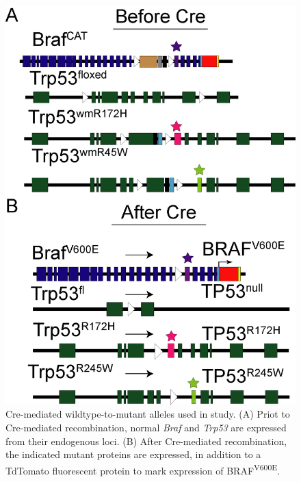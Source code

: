 \begin{figure}
\hypertarget{fig:04}{%
\centering
\includegraphics[width=1\textwidth,height=\textheight]{images/p53_1.png}
\caption{Cre-mediated wildtype-to-mutant alleles used in study. (A) Priot to Cre-mediated recombination, normal \emph{Braf} and \emph{Trp53} are expressed from their endogenous loci. (B) After Cre-mediated recombination, the indicated mutant proteins are expressed, in addition to a TdTomato fluorescent protein to mark expression of BRAF\textsuperscript{V600E}.}\label{fig:04}
}
\end{figure}

